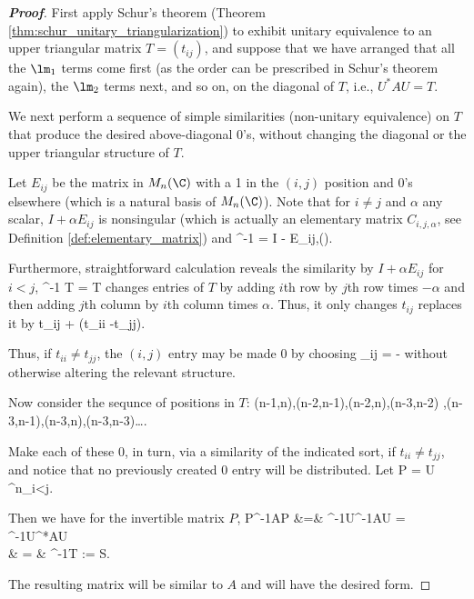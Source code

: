 \begin{proof}[\bf Proof]%
First apply Schur's theorem (Theorem \ref{thm:schur_unitary_triangularization}) to exhibit unitary equivalence to an upper triangular matrix $T = (t_{ij})$, and suppose that we have arranged that
all the $\lm_1$ terms come first (as the order can be prescribed in Schur's theorem again), the $\lm_2$ terms next, and so on, on the diagonal of $T$, i.e., $U^*AU = T$.

We next perform a sequence of simple similarities (non-unitary equivalence) on $T$ that produce the desired above-diagonal 0's, without changing the diagonal or the upper triangular structure of
$T$.

Let $E_{ij}$ be the matrix in $M_n(\C)$ with a 1 in the $(i,j)$ position and 0's elsewhere (which is a natural basis of $M_n(\C)$). Note that for $i\neq j$ and $\alpha$ any scalar, $I + \alpha
E_{ij}$ is nonsingular (which is actually an elementary matrix $C_{i,j,\alpha}$, see Definition \ref{def:elementary_matrix}) and
\be
{}^{-1} = I - \alpha E_{ij},\qquad ().
\ee

Furthermore, straightforward calculation reveals the similarity by $I + \alpha E_{ij}$ for $i<j$,
\be
{}^{-1} T  =   T 
\ee
changes entries of $T$ by adding $i$th row by $j$th row times $-\alpha$ and then adding $j$th column by $i$th column times $\alpha$. %
Thus, it only changes $t_{ij}$ replaces it by
\be
t_{ij} + \alpha (t_{ii} -t_{jj}).
\ee

Thus, if $t_{ii} \neq t_{jj}$, the $(i,j)$ entry may be made 0 by choosing
\be
\alpha_{ij} = -
\ee
without otherwise altering the relevant structure.

Now consider the sequnce of positions in $T$:
\be
(n-1,n),\quad (n-2,n-1),\quad (n-2,n),\quad (n-3,n-2) ,\quad (n-3,n-1),\quad (n-3,n),\quad (n-3,n-3)\dots.
\ee

Make each of these 0, in turn, via a similarity of the indicated sort, if $t_{ii} \neq t_{jj}$, and notice that no previously created 0 entry will be distributed. Let
\be
P = U \prod^n_{i<j}.
\ee

Then we have for the invertible matrix $P$,
\beast
P^{-1}AP &=& ^{-1}U^{-1}AU  = ^{-1}U^*AU  \\
& = & ^{-1}T  := S.
\eeast

The resulting matrix will be similar to $A$ and will have the desired form.%
\end{proof}






